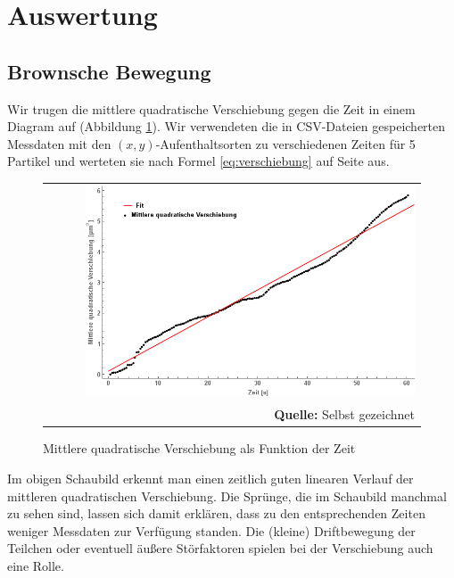 \documentclass[a4paper,titlepage]{scrartcl}
\numberwithin{equation}{section}
\begin{document}
\section{Auswertung}
\label{subsec:brown}
\subsection{Brownsche Bewegung}
Wir trugen die mittlere quadratische Verschiebung gegen die Zeit in einem Diagram auf (Abbildung \ref{fig:msd}). Wir verwendeten die in CSV-Dateien gespeicherten Messdaten mit den $(x,y)$-Aufenthaltsorten zu verschiedenen Zeiten für 5 Partikel und werteten sie nach Formel \ref{eq:verschiebung} auf Seite \pageref{eq:verschiebung} aus.
\begin{figure}[H]
	\centering
	\begin{tabular}{@{}r@{}}
		\includegraphics[width=0.9\textwidth]{images/msd.png}\\
		\footnotesize\sffamily\textbf{Quelle:} Selbst gezeichnet
	\end{tabular}
	\caption{Mittlere quadratische Verschiebung als Funktion der Zeit}
    \label{fig:msd}
\end{figure}
Im obigen Schaubild erkennt man einen zeitlich guten linearen Verlauf der mittleren quadratischen Verschiebung. Die Sprünge, die im Schaubild manchmal zu sehen sind, lassen sich damit erklären, dass zu den entsprechenden Zeiten weniger Messdaten zur Verfügung standen. Die (kleine) Driftbewegung der Teilchen oder eventuell äußere Störfaktoren spielen bei der Verschiebung auch eine Rolle.
\end{document}
